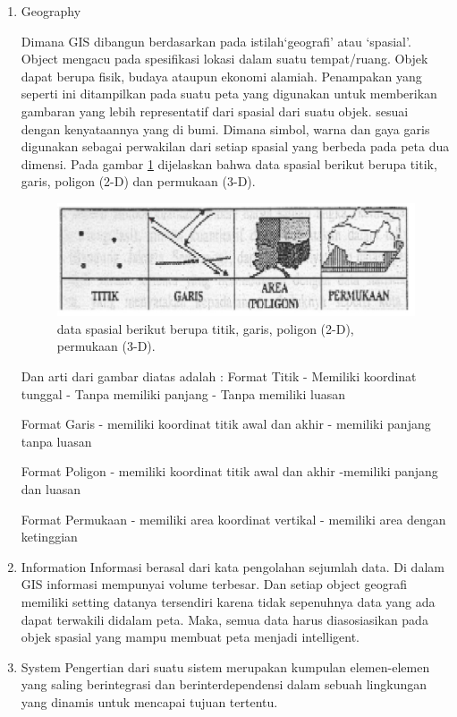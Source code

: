 \begin{enumerate}
\item Geography

Dimana GIS dibangun berdasarkan pada istilah‘geografi’ atau ‘spasial’.
Object mengacu pada spesifikasi lokasi dalam suatu tempat/ruang. Objek dapat berupa fisik,
budaya ataupun ekonomi alamiah. Penampakan yang seperti ini ditampilkan pada suatu peta yang 
digunakan untuk memberikan gambaran yang lebih representatif dari spasial dari suatu objek.
sesuai dengan kenyataannya yang di bumi. Dimana simbol, warna dan gaya garis digunakan sebagai
perwakilan dari setiap spasial yang berbeda pada peta dua dimensi.
Pada gambar \ref{dataspasial} dijelaskan bahwa data spasial berikut berupa 
titik, garis, poligon (2-D) dan permukaan (3-D).

\begin{figure}[ht]
	\centerline{\includegraphics[width=1\textwidth]{figures/dataspasial.JPEG}}
	\caption{data spasial berikut berupa titik, garis, poligon (2-D), permukaan (3-D).}
	\label{dataspasial}
	\end{figure}

Dan arti dari gambar diatas adalah :
Format Titik 						
- Memiliki koordinat tunggal 		
- Tanpa memiliki panjang 			
- Tanpa memiliki luasan

Format Garis
- memiliki koordinat titik awal dan akhir		
- memiliki panjang tanpa luasan

Format Poligon 					
- memiliki koordinat titik awal dan akhir
-memiliki panjang dan luasan 		

Format Permukaan
- memiliki area koordinat vertikal
- memiliki area dengan ketinggian

\item Information
Informasi berasal dari kata pengolahan sejumlah data. Di dalam GIS informasi mempunyai
volume terbesar. Dan setiap object geografi memiliki setting datanya tersendiri karena 
tidak sepenuhnya data yang ada dapat terwakili didalam peta. Maka, semua data harus
diasosiasikan pada objek spasial yang mampu membuat peta menjadi intelligent.

\item System
Pengertian dari suatu sistem merupakan kumpulan elemen-elemen yang saling berintegrasi 
dan berinterdependensi dalam sebuah lingkungan yang dinamis untuk mencapai tujuan tertentu.
\end{enumerate}

